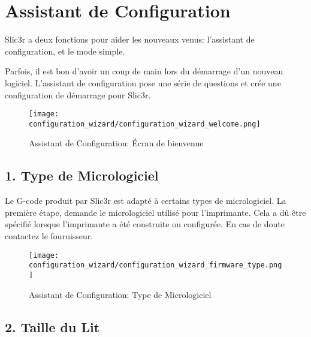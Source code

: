 
\section{Assistant de Configuration}
\label{sec:configuration_wizard}

Slic3r a deux fonctions pour aider les nouveaux venus: l'assistant de configuration, et le mode simple.

Parfois, il est bon d'avoir un coup de main lors du d\'emarrage d'un nouveau logiciel. L'assistant de configuration pose une s\'erie de questions et cr\'ee une configuration de d\'emarrage pour Slic3r.

\begin{figure}[H]
\centering
\texttt{[image: configuration\_wizard/configuration\_wizard\_welcome.png]}
\caption{Assistant de Configuration: \'Ecran de bienvenue}
\label{fig:configuration_wizard_welcome_screen}
\end{figure}

\newpage
\subsection{1. Type de Micrologiciel}
\label{sub:1_firmware_type}

Le G-code produit par Slic3r est adapt\'e \`a certains types de micrologiciel. La premi\`ere \'etape, demande le micrologiciel utilis\'e pour l'imprimante. Cela a d\^u \^etre sp\'ecifi\'e lorsque l'imprimante a \'et\'e construite ou configur\'ee. En cas de doute contactez le fournisseur.
\begin{figure}[H]
\centering
\texttt{[image: configuration\_wizard/configuration\_wizard\_firmware\_type.png]}
\caption{Assistant de Configuration: Type de Micrologiciel}
\label{fig:configuration_wizard_firmware_type}
\end{figure}

\newpage
\subsection{2. Taille du Lit}
\label{sub:2_bed_size}


